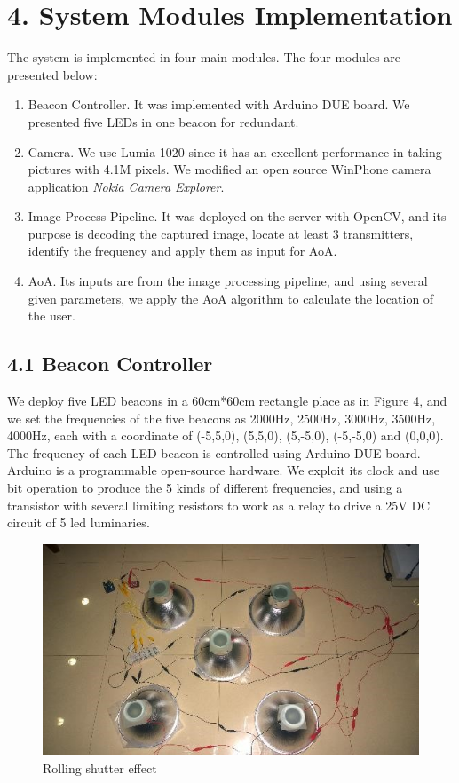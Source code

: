 \documentclass[a4paper, 11pt]{article} %
\begin{document}
\section*{4. System Modules Implementation}
The system is implemented in four main modules. The four modules are presented below:
\begin{enumerate}
	\item Beacon Controller. It was implemented with Arduino DUE board. We presented five LEDs in one beacon for redundant.
	\item Camera. We use Lumia 1020 since it has an excellent performance in taking pictures with 4.1M pixels. We modified an open source WinPhone camera application \textit{Nokia Camera Explorer\cite{NCE}}. 
	\item Image Process Pipeline. It was deployed on the server with OpenCV, and its purpose is decoding the captured image, locate at least 3 transmitters, identify the frequency and apply them as input for AoA.
	\item AoA. Its inputs are from the image processing pipeline, and using several given parameters, we apply the AoA algorithm to calculate the location of the user.
\end{enumerate}

\subsection*{4.1 Beacon Controller}
We deploy five LED beacons in a 60cm*60cm rectangle place as in Figure 4, and we set the frequencies of the five beacons as 2000Hz, 2500Hz, 3000Hz, 3500Hz, 4000Hz, each with a coordinate of (-5,5,0), (5,5,0), (5,-5,0), (-5,-5,0) and (0,0,0). 
The frequency of each LED beacon is controlled using Arduino DUE board. Arduino is a programmable open-source hardware. We exploit its clock and use bit operation to produce the 5 kinds of different frequencies, and using a transistor with several limiting resistors to work as a relay to drive a 25V DC circuit of 5 led luminaries.
\begin{figure}[h]
	\centering 
	\includegraphics[width=0.8\linewidth]{Figure3.jpg}
	\caption{Rolling shutter effect}
	\label{fig:subfig}
\end{figure}
\end{document}

